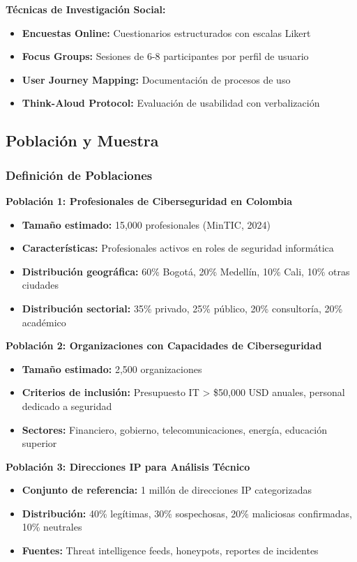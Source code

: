 \textbf{Técnicas de Investigación Social:}
\begin{itemize}
    \item \textbf{Encuestas Online:} Cuestionarios estructurados con escalas Likert
    \item \textbf{Focus Groups:} Sesiones de 6-8 participantes por perfil de usuario
    \item \textbf{User Journey Mapping:} Documentación de procesos de uso
    \item \textbf{Think-Aloud Protocol:} Evaluación de usabilidad con verbalización
\end{itemize}

\subsection{Población y Muestra}

\subsubsection{Definición de Poblaciones}

\textbf{Población 1: Profesionales de Ciberseguridad en Colombia}
\begin{itemize}
    \item \textbf{Tamaño estimado:} 15,000 profesionales (MinTIC, 2024)
    \item \textbf{Características:} Profesionales activos en roles de seguridad informática
    \item \textbf{Distribución geográfica:} 60\% Bogotá, 20\% Medellín, 10\% Cali, 10\% otras ciudades
    \item \textbf{Distribución sectorial:} 35\% privado, 25\% público, 20\% consultoría, 20\% académico
\end{itemize}

\textbf{Población 2: Organizaciones con Capacidades de Ciberseguridad}
\begin{itemize}
    \item \textbf{Tamaño estimado:} 2,500 organizaciones
    \item \textbf{Criterios de inclusión:} Presupuesto IT > \$50,000 USD anuales, personal dedicado a seguridad
    \item \textbf{Sectores:} Financiero, gobierno, telecomunicaciones, energía, educación superior
\end{itemize}

\textbf{Población 3: Direcciones IP para Análisis Técnico}
\begin{itemize}
    \item \textbf{Conjunto de referencia:} 1 millón de direcciones IP categorizadas
    \item \textbf{Distribución:} 40\% legítimas, 30\% sospechosas, 20\% maliciosas confirmadas, 10\% neutrales
    \item \textbf{Fuentes:} Threat intelligence feeds, honeypots, reportes de incidentes
\end{itemize}

